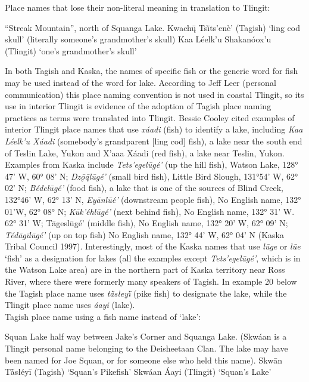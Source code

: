 Place names that lose their non-literal meaning in translation to Tlingit:
\begin{exe} “Streak Mountain”, north of Squanga Lake.
	\sn Kwachų̄ Tsī̀ts’enè’ (Tagish)	`ling cod skull'
(literally someone’s grandmother’s skull)
	\sn Kaa  Léelk’u Shakanóox’u (Tlingit)	`one’s grandmother’s skull'
\end{exe}

In both Tagish and Kaska, the names of specific fish or the generic word for fish may be used instead of the word for lake. According to Jeff Leer (personal communication) this place naming convention is not used in coastal Tlingit, so its use in interior Tlingit is evidence of the adoption of Tagish place naming practices as terms were translated into Tlingit. Bessie Cooley cited examples of interior Tlingit place names that use \textit{xáadi} (fish) to identify a lake, including \textit{Kaa Léelk’u Xáadi} (somebody’s grandparent [ling cod] fish), a lake near the south end of Teslin Lake, Yukon and X’aaa Xáadi (red fish), a lake near Teslin, Yukon. Examples from Kaska include \textit{Tets’egelūgé’} (up the hill fish), Watson Lake, 128° 47' W, 60° 08' N; \textit{Dzǭą̄lūgé’} (small bird fish), Little Bird Slough, 131°54' W, 62° 02' N; \textit{Bédelūgé’} (food fish),  a lake that is one of the sources of Blind Creek, 132°46' W, 62° 13' N, \textit{Eyānlūé’} (downstream people fish), No English name, 132° 01'W, 62° 08° N; \textit{Kūk’éhlūgé’} (next behind fish), No English name, 132° 31' W. 62° 31' W; Tāgeslūgé’ (middle fish), No English name, 132° 20' W, 62° 09' N; \textit{Tédāgīlūgé’} (up on top fish) No English name, 132° 44' W, 62° 04' N (Kaska Tribal Council 1997). Interestingly, most of the Kaska names that use \textit{lūge} or \textit{lūe} ‘fish’ as a designation for lakes (all the examples except \textit{Tets’egelūgé’}, which is in the Watson Lake area) are in the northern part of Kaska territory near Ross River, where there were formerly many speakers of Tagish.  In example 20 below the Tagish place name uses \textit{tā̀słeyī̀ }(pike fish) to designate the lake, while the Tlingit place name uses \textit{áayi} (lake).\\

Tagish place name using a fish name instead of ‘lake’:
\begin{exe}
 Squan Lake half way between Jake’s Corner and Squanga Lake. (Skwáan is a Tlingit personal name belonging to the Deisheetaan Clan. The lake may have been named for Joe Squan, or for someone else who held this name).
	\sn Skwān Tā̀słéyī 	(Tagish)	`Squan’s Pikefish'
	\sn Skwáan Áayi (Tlingit)		`Squan’s Lake'
\end{exe}



